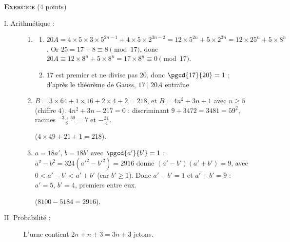 \providecommand{\cm}{~\mathrm{cm}}
\providecommand{\dx}{~\mathrm{d}x}
\providecommand{\Courbe}{(\mathscr{C})}
\providecommand{\Plan}{(\mathscr{P})}
\providecommand{\mes}[2]{\mathrm{mes}\left( \widehat{ \overrightarrow{#1} ; \overrightarrow{#2} } \right)}
\providecommand{\Angl}[2]{\left( \overrightarrow{#1} ; \overrightarrow{#2} \right)}
%
\noindent \underline{\textsc{\textbf{Exercice}}} (4 points)
\begin{description}
	\item[I. Arithmétique :]
	\begin{enumerate}
		\item
		\begin{enumerate}
			\item {}
				$20A = 4 \times 5 \times 3 \times 5^{2n-1} + 4 \times 5 \times 2^{3n-2} = 12 \times 5^{2n} + 5 \times 2^{3n} = 12 \times 25^n + 5 \times 8^n$.
				Or $25 = 17 + 8 \equiv 8 \pmod{17}$, donc $20A \equiv 12 \times 8^n + 5 \times 8^n = 17 \times 8^n \equiv 0 \pmod{17}$.
				\par\noindent{}
			\item {}
				$17$ est premier et ne divise pas $20$, donc $\pgcd{17}{20} = 1$ ; d'après le théorème de Gauss, $17 \mid 20A$ entraîne
				\par\noindent{}
		\end{enumerate}
		\item {}
			$B = 3 \times 64 + 1 \times 16 + 2 \times 4 + 2 = 218$, et $B = 4n^2 + 3n + 1$ avec $n \geq 5$ (chiffre $4$).
			$4n^2 + 3n - 217 = 0$ : discriminant $9 + 3472 = 3481 = 59^2$, racines $\frac{-3 + 59}{8} = 7$ et $-\frac{31}{4}$.
			\par\noindent{} ($4 \times 49 + 21 + 1 = 218$).
		\item {}
			$a = 18a'$, $b = 18b'$ avec $\pgcd{a'}{b'} = 1$ ; $a^2 - b^2 = 324(a'^2 - b'^2) = 2916$ donne $(a' - b')(a' + b') = 9$, avec $0 < a' - b' < a' + b'$ (car $b' \geq 1$).
			Donc $a' - b' = 1$ et $a' + b' = 9$ : $a' = 5$, $b' = 4$, premiers entre eux.
			\par\noindent{} ($8100 - 5184 = 2916$).
	\end{enumerate}
	\item[II. Probabilité :] L'urne contient $2n + n + 3 = 3n + 3$ jetons.

\end{description}
